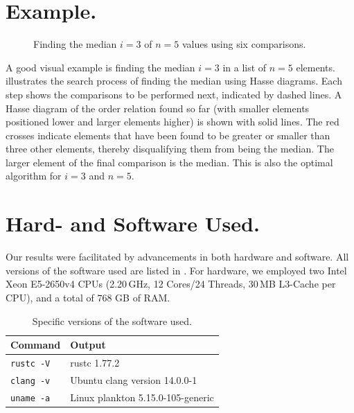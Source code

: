 \documentclass[twoside,leqno,twocolumn]{article}
\begin{document}




\clearpage
\appendix


\section{Example.}
\begin{figure}[!b]
  \centering
  
  \caption{Finding the median $i = 3$ of $n = 5$ values using six comparisons.}
  \label{fig:median_of_5}
\end{figure}

A good visual example is finding the median $i = 3$ in a list of $n = 5$ elements.
 illustrates the search process of finding the median using Hasse diagrams.
Each step shows the comparisons to be performed next, indicated by dashed lines.
A Hasse diagram of the order relation found so far (with smaller elements positioned lower and larger elements higher) is shown with solid lines.
The red crosses indicate elements that have been found to be greater or smaller than three other elements, thereby disqualifying them from being the median.
The larger element of the final comparison is the median.
This is also the optimal algorithm for $i = 3$ and $n = 5$.






\section{Hard- and Software Used.} \label{sec:hardware}

Our results were facilitated by advancements in both hardware and software.
All versions of the software used are listed in .
For hardware, we employed two Intel Xeon E5-2650v4 CPUs (2.20\,GHz, 12 Cores/24 Threads, 30\,MB L3-Cache per CPU), and a total of $768$ GB of RAM.

\begin{table}[!t]
  \renewcommand{\arraystretch}{1.1}
  \caption{Specific versions of the software used.}
  \label{table:command_outputs}
  \centering
  \small
  \begin{tabular}{l|l}
    \textbf{Command}  & \textbf{Output}                   \\ \hline
    \texttt{rustc -V} & rustc 1.77.2                      \\ \hline
    \texttt{clang -v} & Ubuntu clang version 14.0.0-1     \\ \hline
    \texttt{uname -a} & Linux plankton 5.15.0-105-generic \\
  \end{tabular}
\end{table}
\end{document}
